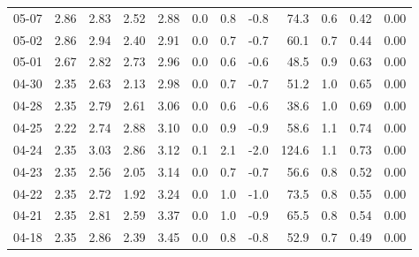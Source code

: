 \begin{threeparttable}
{\begin{tabular}{lrrrrrrrrrrr}
  05-07 &          2.86 &          2.83 &          2.52 &        2.88 &                 0.0 &                 0.8 &       -0.8 &                74.3 &              0.6 &            0.42 &                   0.00 \\
  05-02 &          2.86 &          2.94 &          2.40 &        2.91 &                 0.0 &                 0.7 &       -0.7 &                60.1 &              0.7 &            0.44 &                   0.00 \\
  05-01 &          2.67 &          2.82 &          2.73 &        2.96 &                 0.0 &                 0.6 &       -0.6 &                48.5 &              0.9 &            0.63 &                   0.00 \\
  04-30 &          2.35 &          2.63 &          2.13 &        2.98 &                 0.0 &                 0.7 &       -0.7 &                51.2 &              1.0 &            0.65 &                   0.00 \\
  04-28 &          2.35 &          2.79 &          2.61 &        3.06 &                 0.0 &                 0.6 &       -0.6 &                38.6 &              1.0 &            0.69 &                   0.00 \\
  04-25 &          2.22 &          2.74 &          2.88 &        3.10 &                 0.0 &                 0.9 &       -0.9 &                58.6 &              1.1 &            0.74 &                   0.00 \\
  04-24 &          2.35 &          3.03 &          2.86 &        3.12 &                 0.1 &                 2.1 &       -2.0 &               124.6 &              1.1 &            0.73 &                   0.00 \\
  04-23 &          2.35 &          2.56 &          2.05 &        3.14 &                 0.0 &                 0.7 &       -0.7 &                56.6 &              0.8 &            0.52 &                   0.00 \\
  04-22 &          2.35 &          2.72 &          1.92 &        3.24 &                 0.0 &                 1.0 &       -1.0 &                73.5 &              0.8 &            0.55 &                   0.00 \\
  04-21 &          2.35 &          2.81 &          2.59 &        3.37 &                 0.0 &                 1.0 &       -0.9 &                65.5 &              0.8 &            0.54 &                   0.00 \\
  04-18 &          2.35 &          2.86 &          2.39 &        3.45 &                 0.0 &                 0.8 &       -0.8 &                52.9 &              0.7 &            0.49 &                   0.00 \\

\end{tabular}}
\end{threeparttable}
